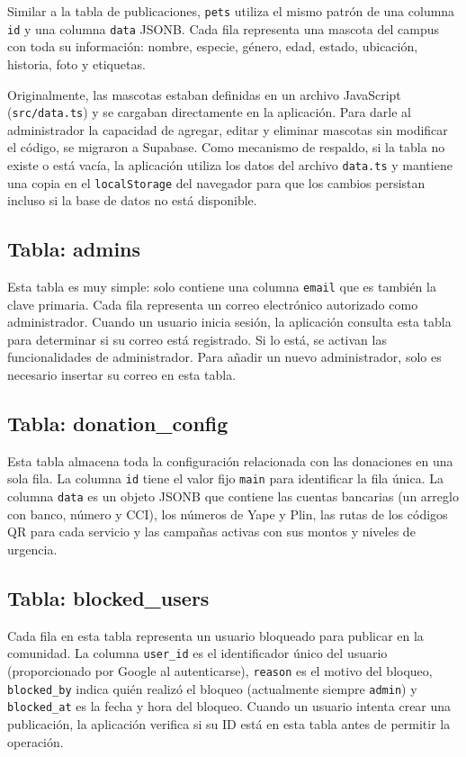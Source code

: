 \documentclass[12pt,a4paper]{article}
\begin{document}
Similar a la tabla de publicaciones, \texttt{pets} utiliza el mismo patrón de una columna \texttt{id} y una columna \texttt{data} JSONB. Cada fila representa una mascota del campus con toda su información: nombre, especie, género, edad, estado, ubicación, historia, foto y etiquetas.

Originalmente, las mascotas estaban definidas en un archivo JavaScript (\texttt{src/data.ts}) y se cargaban directamente en la aplicación. Para darle al administrador la capacidad de agregar, editar y eliminar mascotas sin modificar el código, se migraron a Supabase. Como mecanismo de respaldo, si la tabla no existe o está vacía, la aplicación utiliza los datos del archivo \texttt{data.ts} y mantiene una copia en el \texttt{localStorage} del navegador para que los cambios persistan incluso si la base de datos no está disponible.

\subsection{Tabla: admins}

Esta tabla es muy simple: solo contiene una columna \texttt{email} que es también la clave primaria. Cada fila representa un correo electrónico autorizado como administrador. Cuando un usuario inicia sesión, la aplicación consulta esta tabla para determinar si su correo está registrado. Si lo está, se activan las funcionalidades de administrador. Para añadir un nuevo administrador, solo es necesario insertar su correo en esta tabla.

\subsection{Tabla: donation\_config}

Esta tabla almacena toda la configuración relacionada con las donaciones en una sola fila. La columna \texttt{id} tiene el valor fijo \texttt{main} para identificar la fila única. La columna \texttt{data} es un objeto JSONB que contiene las cuentas bancarias (un arreglo con banco, número y CCI), los números de Yape y Plin, las rutas de los códigos QR para cada servicio y las campañas activas con sus montos y niveles de urgencia.

\subsection{Tabla: blocked\_users}

Cada fila en esta tabla representa un usuario bloqueado para publicar en la comunidad. La columna \texttt{user\_id} es el identificador único del usuario (proporcionado por Google al autenticarse), \texttt{reason} es el motivo del bloqueo, \texttt{blocked\_by} indica quién realizó el bloqueo (actualmente siempre \texttt{admin}) y \texttt{blocked\_at} es la fecha y hora del bloqueo. Cuando un usuario intenta crear una publicación, la aplicación verifica si su ID está en esta tabla antes de permitir la operación.
\end{document}
